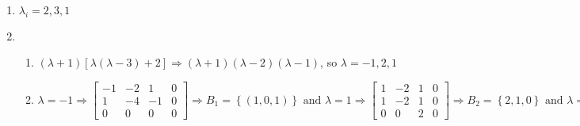 \documentclass[12pt]{article}
\begin{document}
\begin{enumerate}
\begin{enumerate}
      \item $\lambda_1=2\Rightarrow \bold{x}_{\lambda_1}=\left[ \begin{array}{cccc|c} 0 & 0 & 0 & 0 & 0\\ 0 & 0 & 0 & 0 & 0\\ 0 & 0 & -1 & -1 & 0\\ 0 & 0 & -4 & 2 & 0   \end{array} \right]\Rightarrow (s,t,0,0)\text{ and }\lambda_2=4\Rightarrow \bold{x}_{\lambda_2}=\left[ \begin{array}{cccc|c} 2 & 0 & 0 & 0 & 0\\ 0 & 2 & 0 & 0 & 0\\ 0 & 0 & 1 & -1 & 0\\ 0 & 0 & -4 & 4 & 0 \end{array} \right]\Rightarrow (0,0,t,t)\text{ and }\lambda_3=-1\Rightarrow \bold{x}_{\lambda_3}=\left[ \begin{array}{cccc|c} -3 & 0 & 0 & 0 & 0\\ 0 & -3 & 0 & 0 & 0\\ 0 & 0 & -4 & -1 & 0\\ 0 & 0 & -4 & -1& 0   \end{array} \right]\Rightarrow (0,0,t,-4t)$

    \end{enumerate}

    \setcounter{enumi}{40}

  \item $\lambda_i=2,3,1$

    \setcounter{enumi}{46}

  \item 

    \begin{enumerate}

      \item $(\lambda+1)\left[ \lambda(\lambda-3)+2 \right]\Rightarrow (\lambda+1)(\lambda-2)(\lambda-1)$, so $\lambda=-1,2,1$

      \item $\lambda=-1\Rightarrow \left[ \begin{array}{ccc|c} -1 & -2 & 1 & 0\\ 1 & -4 & -1 & 0\\ 0 & 0 & 0 & 0  \end{array} \right]\Rightarrow B_1=\left\{ (1,0,1) \right\}\text{ and }\lambda=1\Rightarrow\left[ \begin{array}{ccc|c} 1 & -2 & 1 & 0\\ 1 & -2 & 1& 0\\ 0 & 0 & 2 & 0  \end{array} \right]\Rightarrow B_2=\left\{ 2,1, 0\right\}\text{ and }\lambda=2\Rightarrow\left[ \begin{array}{ccc|c} 2 & -2 & 1 & 0\\ 1 & -1 & -1 & 0\\ 0 & 0 & 3 & 0  \end{array} \right]\Rightarrow B_3=\left\{(1,1,0)\right\}$


\end{enumerate}
\end{enumerate}
\end{document}
